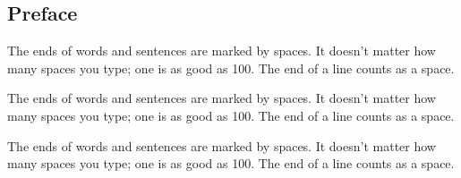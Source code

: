 \cleardoublepage
\begin{frontmatter}
	\chapter*{Preface}%
\end{frontmatter}

The ends of words and sentences are marked by spaces. It doesn't
matter how many spaces you type; one is as good as 100.  The end of
a line counts as a space.

The ends of words and sentences are marked by spaces. It doesn't
matter how many spaces you type; one is as good as 100.  The end of
a line counts as a space.

The ends of words and sentences are marked by spaces. It doesn't
matter how many spaces you type; one is as good as 100.  The end of
a line counts as a space.

\source%
{%
	\author{Name}\\%
}

